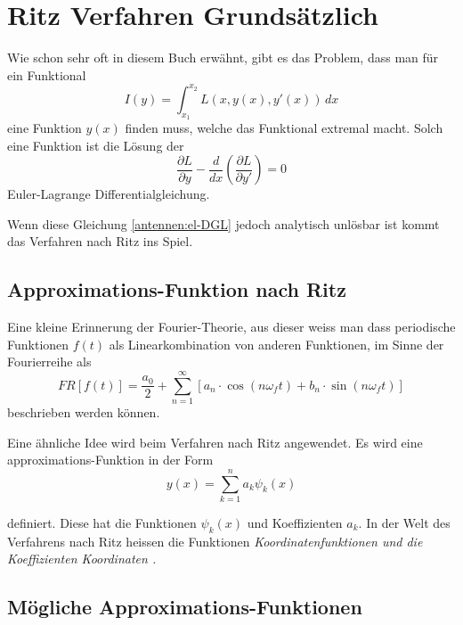 %
%
% 
%
%

\section{Ritz Verfahren Grundsätzlich\label{antennen:ritzGrundsätzlich}}

Wie schon sehr oft in diesem Buch erwähnt, gibt es das Problem, dass man für ein Funktional
\begin{equation}
I(y)=\int_{x_1}^{x_2}L(x,y(x),y'(x))\,dx
\label{antennen:normalesFunktional}
\end{equation}
eine Funktion $y(x)$ finden muss, welche das Funktional extremal macht.
Solch eine Funktion ist die Lösung der
\begin{equation}
\frac{\partial L}{\partial y} - \frac{d}{dx} \left( \frac{\partial L}{\partial y'} \right) = 0
\label{antennen:el-DGL}
\end{equation}
Euler-Lagrange Differentialgleichung.

Wenn diese Gleichung \eqref{antennen:el-DGL} jedoch analytisch unlösbar ist kommt das Verfahren nach Ritz ins Spiel.

\subsection{Approximations-Funktion nach Ritz\label{antennen:approxFunkt}}

Eine kleine Erinnerung der Fourier-Theorie, aus dieser weiss man dass periodische Funktionen $f(t)$ als Linearkombination von anderen Funktionen, im Sinne der Fourierreihe als
\begin{equation}
F R[f(t)]=\frac{a_0}{2}+\sum_{n=1}^{\infty}\left[a_n \cdot \cos \left(n \omega_f t\right)+b_n \cdot \sin \left(n \omega_f t\right)\right]
\label{antenne:fourier}
\end{equation}
beschrieben werden können.

Eine ähnliche Idee wird beim Verfahren nach Ritz angewendet.
Es wird eine approximations-Funktion in der Form
\begin{equation}
y(x)=\sum_{k=1}^n a_k \psi_k(x)
\end{equation}

definiert. Diese hat die Funktionen $\psi_k(x)$ und Koeffizienten $a_k$. 
In der Welt des Verfahrens nach Ritz heissen die Funktionen \em Koordinatenfunktionen \em und die Koeffizienten \em Koordinaten \em.

\subsection{Mögliche Approximations-Funktionen\label{antennen:approxBsp}}

